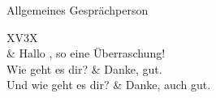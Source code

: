 \begin{discourse}{Allgemeines Gespräch}{person}
\begin{tabularx}{\linewidth}{XV{3}X}
	 \\
	\bline
							& Hallo \fillhere, so eine Überraschung! \\
	\ro Wie geht es dir?	& Danke, gut. \\
	Und wie geht es dir?	& Danke, auch gut. \\
\end{tabularx}
\end{discourse}
